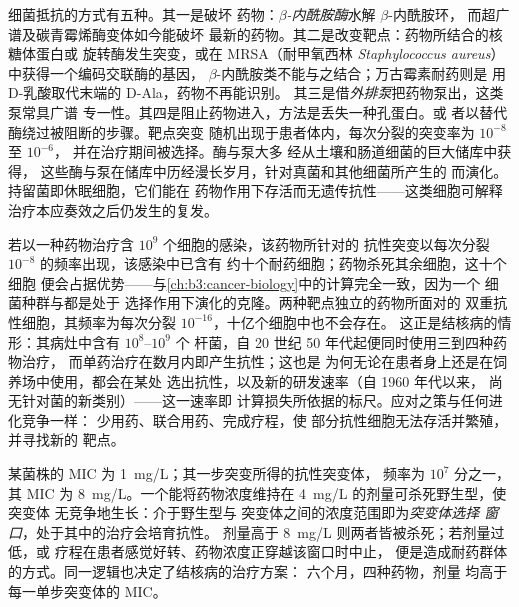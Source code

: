 \begin{definition}[抗性]\label{def:b3:bacteriology:resistance}
细菌抵抗的方式有五种。其一是破坏
药物：\emph{$\beta$-内酰胺酶}水解 $\beta$-内酰胺环，
而超广谱及碳青霉烯酶变体如今能破坏
最新的药物。其二是改变靶点：药物所结合的核糖体蛋白或
旋转酶发生突变，或在 MRSA（耐甲氧西林
\emph{Staphylococcus aureus}）中获得一个编码交联酶的基因，
$\beta$-内酰胺类不能与之结合；万古霉素耐药则是
用 D-乳酸取代末端的 D-Ala，药物不再能识别。
其三是借\emph{外排泵}把药物泵出，这类泵常具广谱
专一性。其四是阻止药物进入，方法是丢失一种孔蛋白。或
者以替代酶绕过被阻断的步骤。靶点突变
随机出现于患者体内，每次分裂的突变率为 $10^{-8}$ 至 $10^{-6}$，
并在治疗期间被选择。酶与泵大多
经从土壤和肠道细菌的巨大储库中获得，
这些酶与泵在储库中历经漫长岁月，针对真菌和其他细菌所产生的
而演化。持留菌即休眠细胞，它们能在
药物作用下存活而无遗传抗性——这类细胞可解释
治疗本应奏效之后仍发生的复发。
\end{definition}

\begin{proposition}\label{prop:b3:bacteriology:selection}
若以一种药物治疗含 $10^{9}$ 个细胞的感染，该药物所针对的
抗性突变以每次分裂 $10^{-8}$ 的频率出现，该感染中已含有
约十个耐药细胞；药物杀死其余细胞，这十个细胞
便会占据优势——与\cref{ch:b3:cancer-biology}中的计算完全一致，因为一个
细菌种群与都是处于
选择作用下演化的克隆。两种靶点独立的药物所面对的
双重抗性细胞，其频率为每次分裂 $10^{-16}$，十亿个细胞中也不会存在。
这正是结核病的情形：其病灶中含有 $10^{8}$--$10^{9}$ 个
杆菌，自 20 世纪 50 年代起便同时使用三到四种药物治疗，
而单药治疗在数月内即产生抗性；这也是
为何无论在患者身上还是在饲养场中使用，都会在某处
选出抗性，以及新的研发速率（自 1960 年代以来，
尚无针对菌的新类别）——这一速率即
计算损失所依据的标尺。应对之策与任何进化竞争一样：
少用药、联合用药、完成疗程，使
部分抗性细胞无法存活并繁殖，并寻找新的
靶点。
\end{proposition}

\begin{example}[突变体选择窗口]\label{ex:b3:bacteriology:window}
某菌株的 MIC 为 \qty{1}{mg/L}；其一步突变所得的抗性突变体，
频率为 $10^{7}$ 分之一，其 MIC 为 \qty{8}{mg/L}。一个能将药物浓度维持在
\qty{4}{mg/L} 的剂量可杀死野生型，使突变体
无竞争地生长：介于野生型与
突变体之间的浓度范围即为\emph{突变体选择
窗口}，处于其中的治疗会培育抗性。
剂量高于 \qty{8}{mg/L} 则两者皆被杀死；若剂量过低，或
疗程在患者感觉好转、药物浓度正穿越该窗口时中止，
便是造成耐药群体的方式。同一逻辑也决定了结核病的治疗方案：
六个月，四种药物，剂量
均高于每一单步突变体的 MIC。
\end{example}

